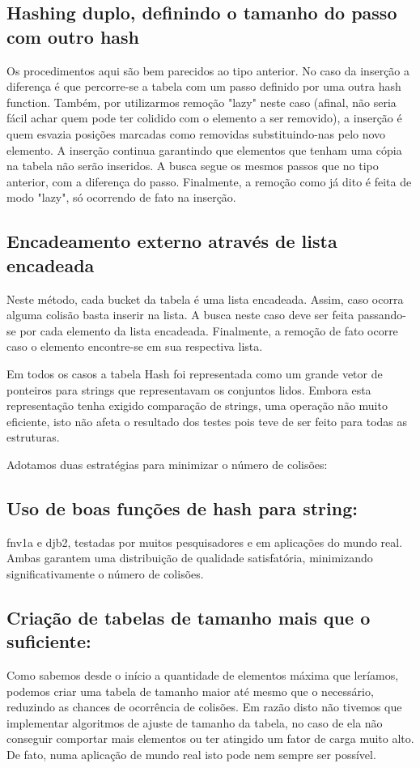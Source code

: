 \documentclass[twoside]{article}
\begin{document}
\begin{multicols}{2}
\subsection{ Hashing duplo, definindo o tamanho do passo com outro hash }
   Os procedimentos aqui são bem parecidos ao tipo anterior. No caso da inserção a diferença é que percorre-se a tabela com um passo definido por uma outra hash function. Também, por utilizarmos remoção "lazy" neste caso (afinal, não seria fácil achar quem pode ter colidido com o elemento a ser removido), a inserção é quem esvazia posições marcadas como removidas substituindo-nas pelo novo elemento. A inserção continua garantindo que elementos que tenham uma cópia na tabela não serão inseridos.
   A busca segue os mesmos passos que no tipo anterior, com a diferença do passo.
   Finalmente, a remoção como já dito é feita de modo "lazy", só ocorrendo de fato na inserção.

\subsection{ Encadeamento externo através de lista encadeada }
   Neste método, cada bucket da tabela é uma lista encadeada. Assim, caso ocorra alguma colisão basta inserir na lista. 
   A busca neste caso deve ser feita passando-se por cada elemento da lista encadeada.
   Finalmente, a remoção de fato ocorre caso o elemento encontre-se em sua respectiva lista.

Em todos os casos a tabela Hash foi representada como um grande vetor de ponteiros para strings que representavam os conjuntos lidos. Embora esta representação tenha exigido comparação de strings, uma operação não muito eficiente, isto não afeta o resultado dos testes pois teve de ser feito para todas as estruturas. 

Adotamos duas estratégias para minimizar o número de colisões:

\subsection{ Uso de boas funções de hash para string: }
   fnv1a e djb2, testadas por muitos pesquisadores e em aplicações do mundo real. Ambas garantem uma distribuição de qualidade satisfatória, minimizando significativamente o número de colisões.

\subsection{ Criação de tabelas de tamanho mais que o suficiente:}
   Como sabemos desde o início a quantidade de elementos máxima que leríamos, podemos criar uma tabela de tamanho maior até mesmo que o necessário, reduzindo as chances de ocorrência de colisões. Em razão disto não tivemos que implementar algoritmos de ajuste de tamanho da tabela, no caso de ela não conseguir comportar mais elementos ou ter atingido um fator de carga muito alto. De fato, numa aplicação de mundo real isto pode nem sempre ser possível.





\end{multicols}
\end{document}

